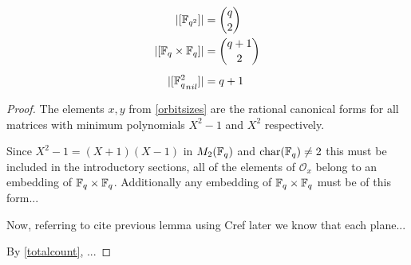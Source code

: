 \documentclass{amsart}
\begin{document}
\begin{theorem}
    \begin{align}
        |[\protect\mathbb{F}_{q^2}]|                  &= \binom{q}{2} \\
        |[\protect\mathbb{F}_q \times \protect\mathbb{F}_q]|         &= \binom{q + 1}{2} \\[0.5em]
        |[{\protect\mathbb{F}_q^2}_{nil}]|            &= q + 1
    \end{align}
\end{theorem}
\begin{proof}
The elements $x, y$ from \cref{orbitsizes} are the rational canonical forms for all matrices with minimum polynomials $X^2 - 1$ and $X^2$ respectively. 

Since $X^2 - 1 = (X + 1)(X - 1)$ in $M_2(\protect\mathbb{F}_q)$ and $\operatorname{char}(\protect\mathbb{F}_q) \neq 2$ {\color{blue} this must be included in the introductory sections}, all of the elements of $\mathcal{O}_x$ belong to an embedding of $\protect\mathbb{F}_q \times \protect\mathbb{F}_q$. Additionally any embedding of $\protect\mathbb{F}_q \times \protect\mathbb{F}_q$ must be of this form...

Now, referring to {\color{blue} cite previous lemma using Cref later} we know that each plane...

By \cref{totalcount}, ...
\end{proof}

\begin{bibdiv}
    \begin{biblist}
    \end{biblist}
\end{bibdiv}
\end{document}
